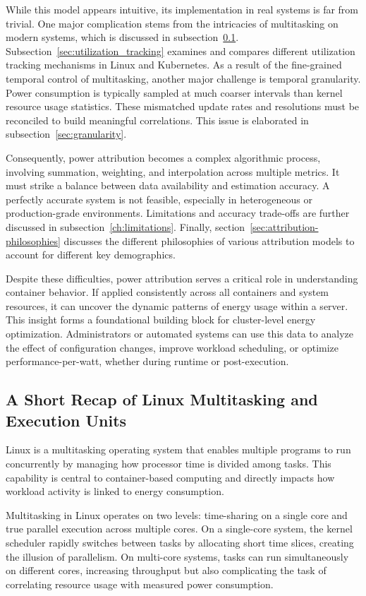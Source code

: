 While this model appears intuitive, its implementation in real systems is far from trivial. One major complication stems from the intricacies of multitasking on modern systems, which is discussed in subsection~\ref{sec:linux-multitasking}. Subsection~\ref{sec:utilization_tracking} examines and compares different utilization tracking mechanisms in Linux and Kubernetes. As a result of the fine-grained temporal control of multitasking, another major challenge is temporal granularity. Power consumption is typically sampled at much coarser intervals than kernel resource usage statistics. These mismatched update rates and resolutions must be reconciled to build meaningful correlations. This issue is elaborated in subsection~\ref{sec:granularity}.

Consequently, power attribution becomes a complex algorithmic process, involving summation, weighting, and interpolation across multiple metrics. It must strike a balance between data availability and estimation accuracy. A perfectly accurate system is not feasible, especially in heterogeneous or production-grade environments. Limitations and accuracy trade-offs are further discussed in subsection~\ref{ch:limitations}. Finally, section~\ref{sec:attribution-philosophies} discusses the different philosophies of various attribution models to account for different key demographics.

Despite these difficulties, power attribution serves a critical role in understanding container behavior. If applied consistently across all containers and system resources, it can uncover the dynamic patterns of energy usage within a server. This insight forms a foundational building block for cluster-level energy optimization. Administrators or automated systems can use this data to analyze the effect of configuration changes, improve workload scheduling, or optimize performance-per-watt, whether during runtime or post-execution.

\subsection{A Short Recap of Linux Multitasking and Execution Units}
\label{sec:linux-multitasking}
Linux is a multitasking operating system that enables multiple programs to run concurrently by managing how processor time is divided among tasks. This capability is central to container-based computing and directly impacts how workload activity is linked to energy consumption.

Multitasking in Linux operates on two levels: time-sharing on a single core and true parallel execution across multiple cores. On a single-core system, the kernel scheduler rapidly switches between tasks by allocating short time slices, creating the illusion of parallelism. On multi-core systems, tasks can run simultaneously on different cores, increasing throughput but also complicating the task of correlating resource usage with measured power consumption.

